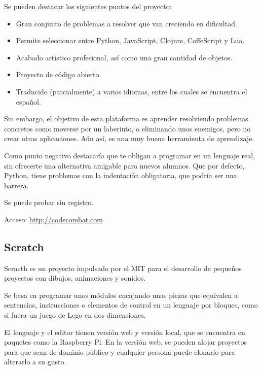 \documentclass{report}
\begin{document}
	
	Se pueden destacar los siguientes puntos del proyecto:
	
	\begin{itemize}
		\item Gran conjunto de problemas a resolver que van creciendo en dificultad.
		\item Permite seleccionar entre Python, JavaScript, Clojure, CoffeScript y Lua.
		\item Acabado artístico profesional, así como una gran cantidad de objetos.
		\item Proyecto de código abierto.
		\item Traducido (parcialmente) a varios idiomas, entre los cuales se encuentra el español.
	\end{itemize}
	
	Sin embargo, el objetivo de esta plataforma es aprender resolviendo problemas concretos como moverse por un laberinto, o eliminando unos enemigos, pero no crear otras aplicaciones. Aún así, es una muy buena herramienta de aprendizaje.
	
	Como punto negativo destacaría que te obligan a programar en un lenguaje real, sin ofrecerte una alternativa amigable para nuevos alumnos. Que por defecto, Python, tiene problemas con la indentación obligatoria, que podría ser una barrera.
	
	Se puede probar sin registro. 
	
	\hfill
	
	Acceso: \url{http://codecombat.com}
	
	\subsection{Scratch}
	
	Scracth es un proyecto impulsado por el MIT para el desarrollo de pequeños proyectos con dibujos, animaciones y sonidos. 
	
	Se basa en programar unos módulos encajando unas piezas que equivalen a sentencias, instrucciones o elementos de control en un lenguaje
	por bloques, como si fuera un juego de Lego en dos dimensiones.
	
	El lenguaje y el editor tienen versión web y versión local, que se encuentra en paquetes como la Raspberry Pi. En la versión web, se pueden alojar proyectos para que 
	sean de dominio público y cualquier persona puede clonarlo para alterarlo a su gusto.
	
\end{document}
